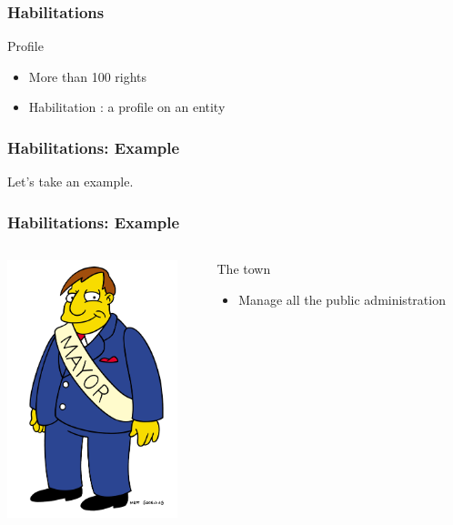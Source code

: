 \documentclass{beamer}
\begin{document}
\begin{frame}
\frametitle{Habilitations}
    \begin{block}{Profile}
        \begin{itemize}
            \item More than 100 rights
            \item Habilitation : a profile on an entity 
        \end{itemize}

    \end{block}
\end{frame}


\begin{frame}
\frametitle{Habilitations: Example}
Let's take an example.
\end{frame}

\begin{frame}
\frametitle{Habilitations: Example}
\begin{columns}
 \begin{column}{0.45\textwidth}
         \includegraphics[height=7.5cm]{./pics/simpsons/mayor_Joe-Quimby.png}
 \end{column}
 \begin{column}{0.45\textwidth}
    \begin{block}{The town}
        \begin{itemize}
            \item Manage all the public administration
        \end{itemize}

    \end{block}

 \end{column}
\end{columns}
\end{frame}
\end{document}
